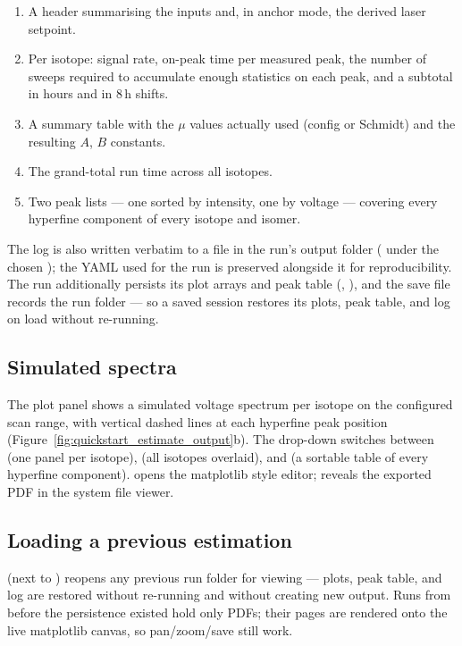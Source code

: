 \begin{enumerate}
    \item A header summarising the inputs and, in anchor mode, the
        derived laser setpoint.
    \item Per isotope: signal rate, on-peak time per measured peak,
        the number of sweeps required to accumulate enough statistics
        on each peak, and a subtotal in hours and in 8\,h shifts.
    \item A  summary table with the $\mu$
        values actually used (config or Schmidt) and the resulting
        $A$, $B$ constants.
    \item The grand-total run time across all isotopes.
    \item Two peak lists --- one sorted by intensity, one by voltage
        --- covering every hyperfine component of every isotope and
        isomer.
\end{enumerate}

The log is also written verbatim to a  file in the run's
output folder ( under the chosen
); the YAML used for the run is preserved
alongside it for reproducibility. The run additionally persists its
plot arrays and peak table (,
), and the save file records the run folder --- so a
saved session restores its plots, peak table, and log on load without
re-running.

\subsection{Simulated spectra}

The plot panel shows a simulated voltage spectrum per isotope on the
configured scan range, with vertical dashed lines at each hyperfine
peak position (Figure~\ref{fig:quickstart_estimate_output}b). The
 drop-down switches between  (one
panel per isotope),  (all isotopes overlaid),
and  (a sortable table of every hyperfine component).
 opens the matplotlib style editor; 
reveals the exported PDF in the system file viewer.

\subsection{Loading a previous estimation}

 (next to ) reopens any
previous  run folder for viewing --- plots,
peak table, and log are restored without re-running and without
creating new output. Runs from before the  persistence
existed hold only PDFs; their pages are rendered onto the live
matplotlib canvas, so pan/zoom/save still work.
